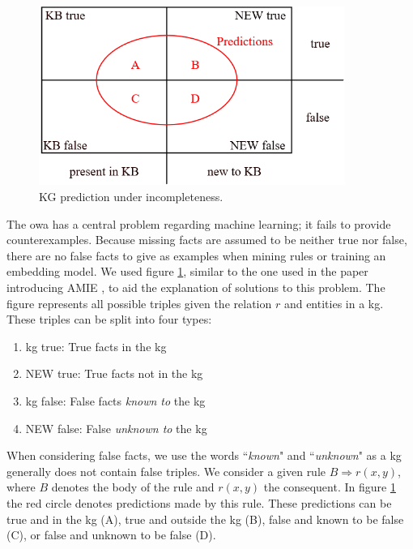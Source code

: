\begin{figure}[htp]
    \centering
    \includegraphics[width=10cm]{figures/kb_venn.png}
    \caption{KG prediction under incompleteness.}
    \label{KB_predictions}
\end{figure}

The \gls{owa} has a central problem regarding machine learning; it fails to provide counterexamples. Because missing facts are assumed to be neither true nor false, there are no false facts to give as examples when mining rules or training an embedding model. We used figure \ref{KB_predictions}, similar to the one used in the paper introducing AMIE \cite{amie}, to aid the explanation of solutions to this problem. The figure represents all possible triples given the relation $r$ and entities in a \gls{kg}. These triples can be split into four types:
\begin{enumerate}
    \item \gls{kg} true: True facts in the \gls{kg}
    \item NEW true: True facts not in the \gls{kg}
    \item \gls{kg} false: False facts \textit{known to} the \gls{kg}
    \item NEW false: False \textit{unknown to} the \gls{kg}
\end{enumerate}
When considering false facts, we use the words ``\textit{known}" and ``\textit{unknown}" as a \gls{kg} generally does not contain false triples. We consider a given rule $B \Rightarrow r(x, y)$, where $B$ denotes the body of the rule and $r(x, y)$ the consequent. In figure \ref{KB_predictions} the red circle denotes predictions made by this rule. These predictions can be true and in the \gls{kg} (A), true and outside the \gls{kg} (B), false and known to be false (C), or false and unknown to be false (D). 

